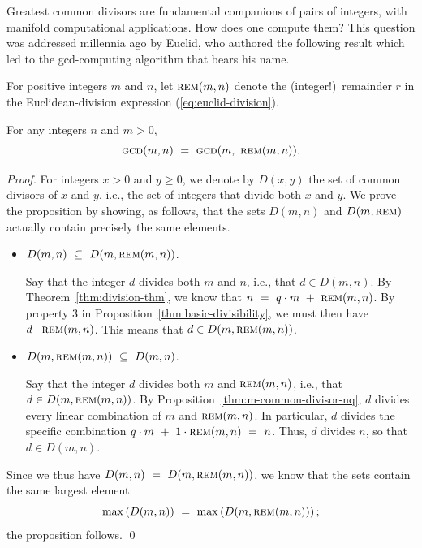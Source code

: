 
Greatest common divisors are fundamental companions of pairs of integers, with manifold computational applications.  How does one compute them?  This question was addressed millennia ago by Euclid, who authored the following result which led to the {\sc gcd}-computing algorithm that bears his name.

For positive integers $m$ and $n$, let $\mbox{\sc rem}(m,n)$ denote the (integer!)~remainder $r$ in the Euclidean-division expression (\ref{eq:euclid-division}).  


\begin{prop}
\label{thm:gcd-basis}
For any integers $n$ and $m > 0$,
\[ \mbox{\sc gcd}(m,n) \ = \  \mbox{\sc gcd}(m, \ \mbox{\sc rem}(m,n)) . \]
\end{prop}

\begin{proof}
For integers $x > 0$ and $y \geq 0$, we denote by $D(x,y)$ the set of common divisors of $x$ and $y$, i.e., the set of integers that divide both $x$ and $y$.  We prove the proposition by showing, as follows, that the sets $D(m, n)$ and $D(m, \mbox{\sc rem})$ actually contain precisely the same elements.
\begin{itemize}
\item 
$D(m, n) \ \subseteq \ D(m, \mbox{\sc rem}(m,n))$.

\smallskip

Say that the integer $d$ divides both $m$ and $n$, i.e., that $d \in D(m,n)$.  By Theorem~\ref{thm:division-thm}, we know that $n \ = \ q \cdot m \ + \ \mbox{\sc rem}(m,n)$.  By property 3 in Proposition~\ref{thm:basic-divisibility}, we must then have $d \mid
\mbox{\sc rem}(m,n)$.  This means that $d \in D(m, \mbox{\sc rem}(m,n))$.

\medskip\item 
$D(m, \mbox{\sc rem}(m,n)) \ \subseteq \ D(m,n)$.

\smallskip

Say that the integer $d$ divides both $m$ and $\mbox{\sc rem}(m,n)$, i.e., that $d \in D(m, \mbox{\sc rem}(m,n))$.  By Proposition~\ref{thm:m-common-divisor-nq}, $d$ divides every linear
combination of $m$ and $\mbox{\sc rem}(m,n)$.  In particular, $d$ divides the specific combination $q \cdot m \ + \ 1 \cdot \mbox{\sc rem}(m,n) \ = \ n$.  Thus, $d$ divides $n$, so that $d \in D(m,n)$.
\end{itemize}
Since we thus have $D(m, n) \ = \ D(m, \mbox{\sc rem}(m,n))$, we know that the sets contain the same largest element:
\[ \max\left( D(m, n) \right) \ = \ \max\left( D(m, \mbox{\sc rem}(m,n)) \right);
\]
the proposition follows.  \qed
\end{proof}


